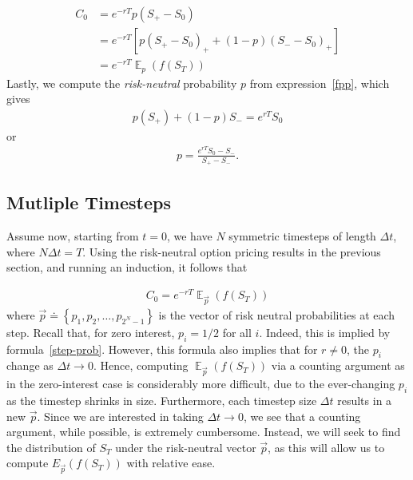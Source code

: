 \documentclass[12pt]{article}
\DeclareMathOperator{\ex}{\mathbb{E}}
\theoremstyle{plain}
\theoremstyle{definition}
\theoremstyle{remark}
\numberwithin{equation}{section}  %
\begin{document}
\begin{equation*}
\begin{split}
	C_{0} &= e^{-rT} p (S_{+} - S_{0})
	\\
	& = e^{-rT}\left[ p {(S_{+} - S_{0})}_{+}+(1-p){(S_{-} - S_{0})}_{+}\right]
	\\
	& = e^{-rT} \ex_{p}(f(S_{T}))
\end{split}
\end{equation*}
Lastly, we compute the \emph{risk-neutral} probability $p$ from expression~\eqref{fpp}, which gives
\begin{equation*}
\begin{split}
	p(S_{+}) + (1 -p)S_{-} = e^{rT} S_{0}
\end{split}
\end{equation*}
or
\begin{equation}\label{step-prob}
\begin{split}
	p = \frac{e^{rT} S_{0} - S_{-}}{S_{+} - S_{-}}.
\end{split}
\end{equation}
\subsection{Mutliple Timesteps}
Assume now, starting from $t=0$,
we have $N$ symmetric timesteps of length $\Delta t$, where
$N \Delta t  = T$. Using the risk-neutral option pricing
results in the previous section, and running an induction,
it follows that 

\begin{equation}\label{ui}
\begin{split}
	C_{0} = e^{-rT} \ex_{\vec{p}}(f(S_{T}))
\end{split}
\end{equation}
where $\vec{p} \doteq \left\{ p_{1}, p_{2}, \ldots, p_{2^{N} -1} \right\}$
is the vector of risk neutral probabilities at each step.
Recall that, for zero interest, 
$p_{i} = 1/2$ for all $i$. Indeed, this is implied by
formula~\eqref{step-prob}. However, this formula also implies that
for $r \neq 0$, the $p_i$ change as $\Delta t \to 0$. 
Hence, computing $\ex_{\vec{p}}(f(S_{T}))$ via a counting argument as
in the zero-interest case is considerably more difficult, due to the
ever-changing $p_i$ as the timestep shrinks in size. Furthermore,
each timestep size $\Delta t$ results in a new $\vec{p}$.
Since we are interested in taking $\Delta t \to 0$, we see that a counting
argument, while possible, is extremely cumbersome.
Instead, we will seek to find the distribution of $S_{T}$ under
the risk-neutral vector $\vec{p}$, as this will allow us to compute
$E_{\vec{p}} (f(S_{T}))$ with relative ease. 
\end{document}
